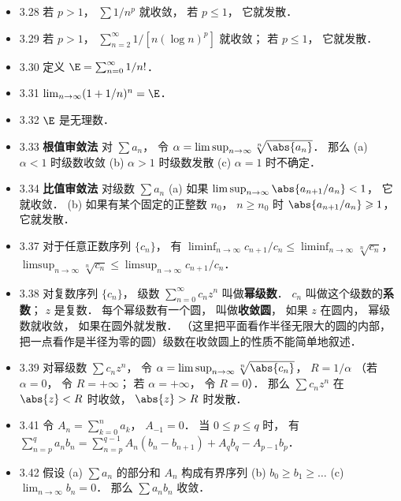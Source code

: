 \begin{itemize}
\item 3.28 若 $p>1$， $\sum 1/n^p$ 就收敛， 若 $p\leqslant 1$， 它就发散．

\item 3.29 若 $p>1$， $\sum_{n=2}^\infty 1/[n(\log n)^p]$ 就收敛； 若 $p\leqslant 1$， 它就发散．

\item 3.30 定义 $\E=\sum_{n=0}^\infty 1/n!$．

\item 3.31 $\lim_{n\to\infty} (1+1/n)^n = \E$．

\item 3.32 $\E$ 是无理数．

\item 3.33 \textbf{根值审敛法} 对 $\sum a_n$， 令 $\alpha = \limsup_{n\to\infty} \sqrt[n]{\abs{a_n}}$． 那么 (a) $\alpha<1$ 时级数收敛 (b) $\alpha>1$ 时级数发散 (c) $\alpha=1$ 时不确定．

\item 3.34 \textbf{比值审敛法} 对级数 $\sum a_n$ (a) 如果 $\limsup_{n\to\infty} \abs{a_{n+1}/a_n}<1$， 它就收敛． (b) 如果有某个固定的正整数 $n_0$， $n\geqslant n_0$ 时 $\abs{a_{n+1}/a_n}\geqslant 1$， 它就发散．

\item 3.37 对于任意正数序列 $\{c_n\}$， 有 $\liminf_{n\to\infty} c_{n+1}/c_n \leqslant \liminf_{n\to\infty} \sqrt[n]{c_n}$， $\limsup_{n\to\infty} \sqrt[n]{c_n}\leqslant \limsup_{n\to\infty} c_{n+1}/c_n$．

\item 3.38 对复数序列 $\{c_n\}$， 级数 $\sum_{n=0}^\infty c_n z^n$ 叫做\textbf{幂级数}． $c_n$ 叫做这个级数的\textbf{系数}； $z$ 是复数． 每个幂级数有一个圆， 叫做\textbf{收敛圆}， 如果 $z$ 在圆内， 幂级数就收敛， 如果在圆外就发散． （这里把平面看作半径无限大的圆的内部，把一点看作是半径为零的圆）级数在收敛圆上的性质不能简单地叙述．

\item 3.39 对幂级数 $\sum c_n z^n$， 令 $\alpha=\limsup_{n\to\infty} \sqrt[n]{\abs{c_n}}$， $R=1/\alpha$ （若 $\alpha=0$， 令 $R=+\infty$； 若 $\alpha=+\infty$， 令 $R=0$）． 那么 $\sum c_n z^n$ 在 $\abs{z}<R$ 时收敛， $\abs{z}>R$ 时发散．

\item 3.41 令 $A_n=\sum_{k=0}^n a_k$， $A_{-1}=0$． 当 $0\leqslant p\leqslant q$ 时， 有 $\sum_{n=p}^q a_n b_n = \sum_{n=p}^{q-1} A_n(b_n-b_{n+1}) + A_qb_q - A_{p-1} b_p$．

\item 3.42 假设 (a) $\sum a_n$ 的部分和 $A_n$ 构成有界序列 (b) $b_0\geqslant b_1\geqslant \dots$ (c) $\lim_{n\to\infty} b_n=0$． 那么 $\sum a_n b_n$ 收敛．


\end{itemize}
